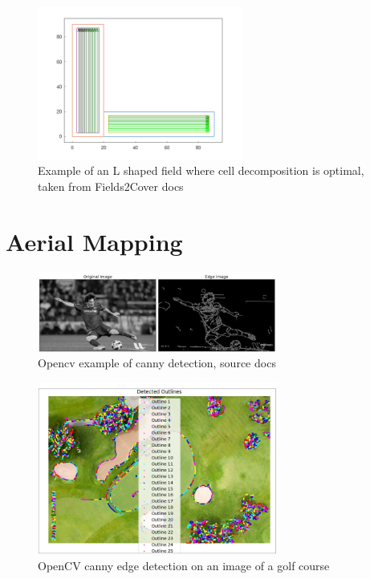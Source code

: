 \documentclass[final]{cmpreport_02}
\begin{document}
\begin{figure}[h!]
	\centering
	\includegraphics[width=0.6\textwidth]{./images/f2cCellDecompL.png}
	\caption{Example of an L shaped field where cell decomposition is optimal, taken from Fields2Cover docs}
	\label{ccpp:cellDecomp}
\end{figure}

\section{Aerial Mapping}

\begin{figure}[h!]
	\centering
	\includegraphics[width=0.7\textwidth]{./images/openCvCannyExample.jpg}
	\caption{Opencv example of canny detection, source \citep{opencv_library} docs}
	\label{am:cannyexample}
\end{figure}


\begin{figure}[h!]
	\centering
	\includegraphics[width=0.7\textwidth]{./images/openCvCannyGolfCourse.png}
	\caption{OpenCV canny edge detection on an image of a golf course}
	\label{am:CannyGolfCourse}
\end{figure}
\end{document}
